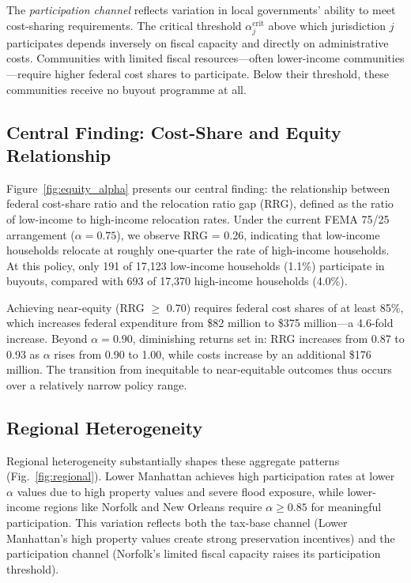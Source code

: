 \documentclass[preprint,12pt,authoryear]{elsarticle}
\begin{document}
The \textit{participation channel} reflects variation in local governments' ability to meet cost-sharing requirements. The critical threshold $\alpha_j^{\text{crit}}$ above which jurisdiction $j$ participates depends inversely on fiscal capacity and directly on administrative costs. Communities with limited fiscal resources---often lower-income communities---require higher federal cost shares to participate. Below their threshold, these communities receive no buyout programme at all.

\subsection{Central Finding: Cost-Share and Equity Relationship}

Figure~\ref{fig:equity_alpha} presents our central finding: the relationship between federal cost-share ratio and the relocation ratio gap (RRG), defined as the ratio of low-income to high-income relocation rates. Under the current FEMA 75/25 arrangement ($\alpha = 0.75$), we observe RRG = 0.26, indicating that low-income households relocate at roughly one-quarter the rate of high-income households. At this policy, only 191 of 17,123 low-income households (1.1\%) participate in buyouts, compared with 693 of 17,370 high-income households (4.0\%).

Achieving near-equity (RRG $\geq$ 0.70) requires federal cost shares of at least 85\%, which increases federal expenditure from \$82 million to \$375 million---a 4.6-fold increase. Beyond $\alpha = 0.90$, diminishing returns set in: RRG increases from 0.87 to 0.93 as $\alpha$ rises from 0.90 to 1.00, while costs increase by an additional \$176 million. The transition from inequitable to near-equitable outcomes thus occurs over a relatively narrow policy range.

\subsection{Regional Heterogeneity}

Regional heterogeneity substantially shapes these aggregate patterns (Fig.~\ref{fig:regional}). Lower Manhattan achieves high participation rates at lower $\alpha$ values due to high property values and severe flood exposure, while lower-income regions like Norfolk and New Orleans require $\alpha \geq 0.85$ for meaningful participation. This variation reflects both the tax-base channel (Lower Manhattan's high property values create strong preservation incentives) and the participation channel (Norfolk's limited fiscal capacity raises its participation threshold).
\end{document}
